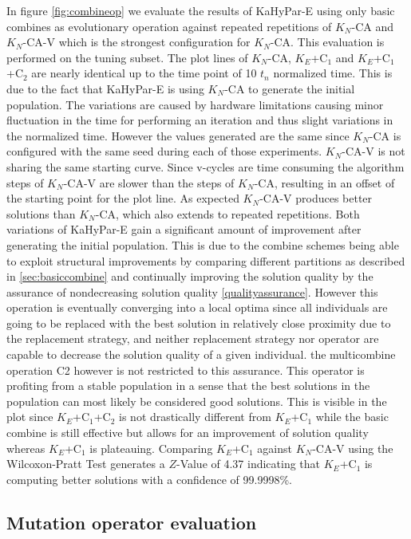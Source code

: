 \documentclass[a4paper,12pt,titlepage, BCOR7mm,headsepline]{scrbook}
\numberwithin{equation}{section}
\begin{document}
In figure \ref{fig:combineop} we evaluate the results of KaHyPar-E using only basic combines as evolutionary operation against repeated repetitions of $K_N$-CA and $K_N$-CA-V which is the strongest configuration for $K_N$-CA. This evaluation is performed on the tuning subset. The plot lines of $K_N$-CA, $K_E$+C$_1$ and $K_E$+C$_1$+C$_2$ are nearly identical up to the time point of 10 $t_n$ normalized time. This is due to the fact that KaHyPar-E is using $K_N$-CA to generate the initial population. The variations are caused by hardware limitations causing minor fluctuation in the time for performing an iteration and thus slight variations in the normalized time. However the values generated are the same since $K_N$-CA is configured with the same seed during each of those experiments. $K_N$-CA-V is not sharing the same starting curve. Since v-cycles are time consuming the algorithm steps of $K_N$-CA-V are slower than the steps of $K_N$-CA, resulting in an offset of the starting point for the plot line. As expected $K_N$-CA-V produces better solutions than $K_N$-CA, which also extends to repeated repetitions. Both variations of KaHyPar-E gain a significant amount of improvement after generating the initial population. This is due to the combine schemes being able to exploit structural improvements by comparing different partitions as described in \ref{sec:basiccombine} and continually improving the solution quality by the assurance of nondecreasing solution quality \ref{qualityassurance}. However this operation is eventually converging into a local optima since all individuals are going to be replaced with the best solution in relatively close proximity due to the replacement strategy, and neither replacement strategy nor operator are capable to decrease the solution quality of a given individual. the multicombine operation C2 however is not restricted to this assurance. This operator is profiting from a stable population in a sense that the best solutions in the population can most likely be considered good solutions. This is visible in the plot since $K_E$+C$_1$+C$_2$ is not drastically different from $K_E$+C$_1$ while the basic combine is still effective but allows for an improvement of solution quality whereas $K_E$+C$_1$ is plateauing. Comparing $K_E$+C$_1$ against $K_N$-CA-V using the Wilcoxon-Pratt Test generates a $Z$-Value of 4.37 indicating that $K_E$+C$_1$ is computing better solutions with a confidence of 99.9998\%.
\subsection{Mutation operator evaluation}
\end{document}
